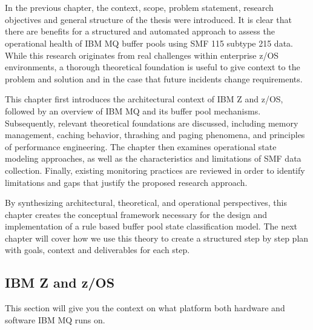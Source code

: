 \chapter{}%
\label{ch:stand-van-zaken}



In the previous chapter, the context, scope, problem statement, research objectives and general structure of the thesis were introduced. It is clear that there are benefits for a structured and automated approach to assess the operational health of IBM MQ buffer pools using SMF 115 subtype 215 data. While this research originates from real challenges within enterprise z/OS environments, a thorough theoretical foundation is useful to give context to the problem and solution and in the case that future incidents change requirements. 

This chapter first introduces the architectural context of IBM Z and z/OS, followed by an overview of IBM MQ and its buffer pool mechanisms. Subsequently, relevant theoretical foundations are discussed, including memory management, caching behavior, thrashing and paging phenomena, and principles of performance engineering. The chapter then examines operational state modeling approaches, as well as the characteristics and limitations of SMF data collection. Finally, existing monitoring practices are reviewed in order to identify limitations and gaps that justify the proposed research approach.

By synthesizing architectural, theoretical, and operational perspectives, this chapter creates the conceptual framework necessary for the design and implementation of a rule based buffer pool state classification model. The next chapter will cover how we use this theory to create a structured step by step plan with goals, context and deliverables for each step. 

\section{IBM Z and z/OS}%
\label{sec:architecture-context}

This section will give you the context on what platform both hardware and software IBM MQ runs on.

